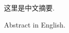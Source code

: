 \begin{cabstract}
这里是中文摘要.
\end{cabstract}


\begin{eabstract}
Abstract in English.
\end{eabstract}


